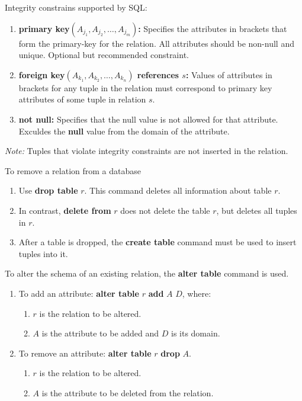 \documentclass[journal,12pt,twocolumn]{IEEEtran}
\begin{document}
Integrity constrains supported by SQL:
\begin{enumerate}
    \item \textbf{primary key$(A_{j_1}, A_{j_2}, \ldots, A_{j_m})$:} Specifies 
    the attributes in brackets that form the primary-key for the relation. All 
    attributes should be non-null and unique. Optional but recommended constraint.
    \item \textbf{foreign key$(A_{k_1}, A_{k_2}, \ldots, A_{k_n})$ references 
    $s$:} Values of attributes in brackets for any tuple in the relation must 
    correspond to primary key attributes of some tuple in relation $s$.
    \item \textbf{not null:} Specifies that the null value is not allowed for 
    that attribute. Exculdes the \textbf{null} value from the domain of the 
    attribute.
\end{enumerate}

\textit{Note:} Tuples that violate integrity constraints are not inserted in 
the relation.

To remove a relation from a database
\begin{enumerate}
    \item Use \textbf{drop table} $r$. This command deletes all information 
    about table $r$.
    \item In contrast, \textbf{delete from} $r$ does not delete the table $r$,
    but deletes all tuples in $r$.
    \item After a table is dropped, the \textbf{create table} command must be 
    used to insert tuples into it.
\end{enumerate}

To alter the schema of an existing relation, the \textbf{alter table} command 
is used.
\begin{enumerate}
    \item To add an attribute: \textbf{alter table} $r$ \textbf{add} $A$ $D$, 
    where:
    \begin{enumerate}
        \item $r$ is the relation to be altered.
        \item $A$ is the attribute to be added and $D$ is its domain.
    \end{enumerate}
    \item To remove an attribute: \textbf{alter table} $r$ \textbf{drop} $A$.
    \begin{enumerate}
        \item $r$ is the relation to be altered.
        \item $A$ is the attribute to be deleted from the relation.
    \end{enumerate}
\end{enumerate}
\end{document}
